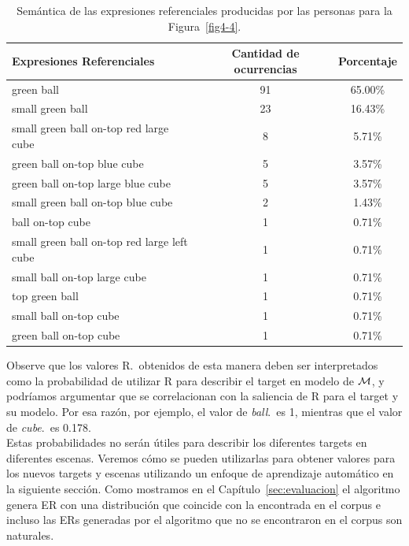 \begin{table}[h!]
\begin{center}
\begin{tabular}{|l|c|c|}
\hline
Expresiones Referenciales & Cantidad de ocurrencias & Porcentaje \\
\hline

green ball & 91 & 65.00\% \\
small green ball   & 23 & 16.43\% \\
small green ball on-top red large cube & 8 & 5.71\% \\
green ball on-top blue cube & 5 & 3.57\% \\
green ball on-top large blue cube & 5 & 3.57\% \\
small green ball on-top blue cube & 2 & 1.43\% \\
ball on-top cube & 1 & 0.71\% \\
small green ball on-top red large left cube  & 1 & 0.71\% \\
small ball on-top large cube & 1 & 0.71\% \\
top green ball  & 1 & 0.71\% \\
small ball on-top cube & 1 & 0.71\% \\
green ball on-top cube & 1 & 0.71\% \\

\hline
\end{tabular}
\caption{Sem\'antica de las expresiones referenciales producidas por las personas para la Figura~\ref{fig4-4}.}\label{corpus-distribution}
\end{center}
\end{table}

Observe que los valores R.\puse\ obtenidos de esta manera deben ser
interpretados como la probabilidad de utilizar R para describir el target en
modelo de $\mathcal{M} $, y podr\'{i}amos argumentar que se correlacionan con la
 saliencia de R para el target y su modelo. Por esa raz\'on, por ejemplo, el
valor de \emph{ball}.\puse\ es 1, mientras que el valor de
\emph{cube}.\puse\ es 0.178. \\

Estas probabilidades no ser\'an \'utiles
para describir los diferentes targets en diferentes escenas. Veremos c\'omo se
pueden utilizarlas para obtener valores para los nuevos targets y escenas utilizando un
enfoque de aprendizaje autom\'atico en la siguiente secci\'on. Como mostramos en el Cap\'itulo~\ref{sec:evaluacion} el algoritmo genera ER
con una distribuci\'on que coincide con la encontrada en el corpus e incluso las ERs generadas por el algoritmo que no se encontraron
en el corpus son naturales.




